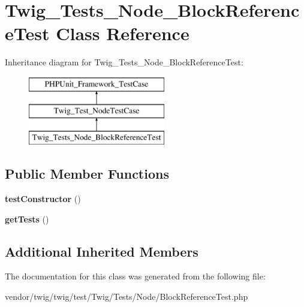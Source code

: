\hypertarget{classTwig__Tests__Node__BlockReferenceTest}{}\section{Twig\+\_\+\+Tests\+\_\+\+Node\+\_\+\+Block\+Reference\+Test Class Reference}
\label{classTwig__Tests__Node__BlockReferenceTest}
Inheritance diagram for Twig\+\_\+\+Tests\+\_\+\+Node\+\_\+\+Block\+Reference\+Test\+:\begin{figure}[H]
\begin{center}
\leavevmode
\includegraphics[height=3.000000cm]{classTwig__Tests__Node__BlockReferenceTest}
\end{center}
\end{figure}
\subsection*{Public Member Functions}
\begin{DoxyCompactItemize}
\item 
{\bfseries test\+Constructor} ()\hypertarget{classTwig__Tests__Node__BlockReferenceTest_aa8b0790a4a476bdabacfedb57c6beb37}{}\label{classTwig__Tests__Node__BlockReferenceTest_aa8b0790a4a476bdabacfedb57c6beb37}

\item 
{\bfseries get\+Tests} ()\hypertarget{classTwig__Tests__Node__BlockReferenceTest_aeff4d2f0b7794bd06226c30a7bf6c439}{}\label{classTwig__Tests__Node__BlockReferenceTest_aeff4d2f0b7794bd06226c30a7bf6c439}

\end{DoxyCompactItemize}
\subsection*{Additional Inherited Members}


The documentation for this class was generated from the following file\+:\begin{DoxyCompactItemize}
\item 
vendor/twig/twig/test/\+Twig/\+Tests/\+Node/Block\+Reference\+Test.\+php\end{DoxyCompactItemize}
